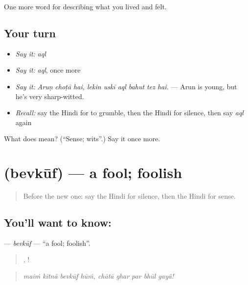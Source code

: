 \begin{grammarlens}[title={What you've built}]
One more word for describing what you lived and felt.
\end{grammarlens}

\subsection*{Your turn}
\begin{itemize}
\raggedright
  \item \emph{Say it:} \emph{aql}
  \item \emph{Say it:} \emph{aql}, once more
  \item \emph{Say it:} \emph{Aruṇ choṭā hai, lekin uskī aql bahut tez hai.} — Arun is young, but he's very sharp-witted.
  \item \emph{Recall:} say the Hindi for to grumble, then the Hindi for silence, then say \emph{aql} again
\end{itemize}

\begin{tcolorbox}[breakable,colback=teal!4,colframe=teal!35!black,title={Before you move on}]
What does  mean? (\textquotedblleft{}Sense; wits\textquotedblright{}.) Say it once more.
\end{tcolorbox}
\section[\texorpdfstring{\hi{बेवकूफ़} (bevkūf)}{बेवकूफ़ (bevkūf)}]{ (bevkūf) — a fool; foolish}

\label{lesson:HI-C474-bevkuf}



\begin{quote}
Before the new one: say the Hindi for silence, then the Hindi for sense.
\end{quote}

\subsection*{You'll want to know: }
\textbf{} — \emph{bevkūf} — \textquotedblleft{}a fool; foolish\textquotedblright{}.

\begin{quote}
   ,     !
\end{quote}

\begin{quote}
\emph{maiṁ kitnā bevkūf hūṁ, chātā ghar par bhūl gayā!}
\end{quote}

